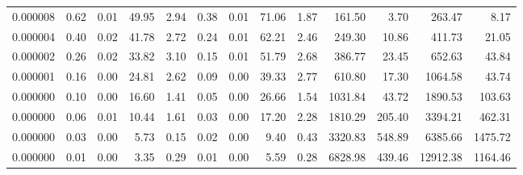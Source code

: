 \begin{tabular}{lrrrrrrrrrrrr}
0.000008 & 0.62 & 0.01 & 49.95 & 2.94 & 0.38 & 0.01 & 71.06 & 1.87 & 161.50 & 3.70 & 263.47 & 8.17 \\
0.000004 & 0.40 & 0.02 & 41.78 & 2.72 & 0.24 & 0.01 & 62.21 & 2.46 & 249.30 & 10.86 & 411.73 & 21.05 \\
0.000002 & 0.26 & 0.02 & 33.82 & 3.10 & 0.15 & 0.01 & 51.79 & 2.68 & 386.77 & 23.45 & 652.63 & 43.84 \\
0.000001 & 0.16 & 0.00 & 24.81 & 2.62 & 0.09 & 0.00 & 39.33 & 2.77 & 610.80 & 17.30 & 1064.58 & 43.74 \\
0.000000 & 0.10 & 0.00 & 16.60 & 1.41 & 0.05 & 0.00 & 26.66 & 1.54 & 1031.84 & 43.72 & 1890.53 & 103.63 \\
0.000000 & 0.06 & 0.01 & 10.44 & 1.61 & 0.03 & 0.00 & 17.20 & 2.28 & 1810.29 & 205.40 & 3394.21 & 462.31 \\
0.000000 & 0.03 & 0.00 & 5.73 & 0.15 & 0.02 & 0.00 & 9.40 & 0.43 & 3320.83 & 548.89 & 6385.66 & 1475.72 \\
0.000000 & 0.01 & 0.00 & 3.35 & 0.29 & 0.01 & 0.00 & 5.59 & 0.28 & 6828.98 & 439.46 & 12912.38 & 1164.46 \\
\bottomrule
\end{tabular}
